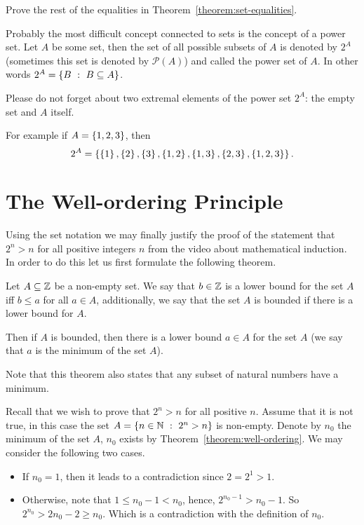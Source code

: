 \begin{exercise}
\label{exercise:set-equalities}
  Prove the rest of the equalities in Theorem~\ref{theorem:set-equalities}.
\end{exercise}

Probably the most difficult concept connected to sets is
the concept of a power set. Let $A$ be some set, then the set of
all possible subsets of $A$ is denoted by $2^A$ (sometimes this set is denoted
by $\mathcal{P}(A)$) and called the power set of $A$. In other words $2^A =
\set[B \subseteq A]{B}$.

\begin{warning}
  Please do not forget about two extremal elements of the power set $2^A$: the
  empty set and $A$ itself.
\end{warning}

\noindent For example if $A = \set{1, 2, 3}$, then $$2^A = \set{\set{1},
\set{2}, \set{3}, \set{1, 2}, \set{1, 3}, \set{2, 3}, \set{1, 2, 3}}.$$

\section{The Well-ordering Principle}
Using the set notation we may finally justify the proof of the statement
that $2^n > n$ for all positive integers $n$ from the video about mathematical
induction. In order to do this let us first formulate the following theorem.
\begin{theorem}
\label{theorem:well-ordering}
  Let $A \subseteq \mathbb{Z}$ be a non-empty set. We say that $b \in \mathbb{Z}$ is a lower
  bound for the set $A$ iff $b \le a$ for all $a \in A$, additionally, we say
  that the set $A$ is bounded if there is a lower bound for $A$.

  Then if $A$ is bounded, then there is a lower bound $a \in A$ for the set $A$
  (we say that $a$ is the minimum of the set $A$).
\end{theorem}
Note that this theorem also states that any subset of natural numbers have a
minimum.

Recall that we wish to prove that $2^n > n$ for all positive $n$.
Assume that it is not true, in this case the set
$A = \set[2^n > n]{n \in \N}$ is non-empty. Denote by $n_0$ the minimum of the
set $A$, $n_0$ exists by Theorem~\ref{theorem:well-ordering}. We may consider
the following two cases.
\begin{itemize}
  \item If $n_0 = 1$, then it leads to a contradiction since $2 = 2^1 > 1$.
  \item Otherwise, note that $1 \le n_0 - 1 < n_0$, hence,
    $2^{n_0 - 1} > n_0 - 1$. So $2^{n_0} > 2n_0 - 2 \ge n_0$. Which is a
    contradiction with the definition of $n_0$.
\end{itemize}

